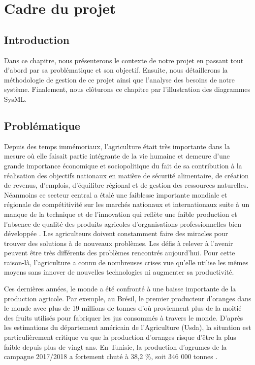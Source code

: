 

	\chapter{Cadre du projet }
\newpage


\section{Introduction }
Dans ce chapitre, nous présenterons le contexte de notre projet en passant tout d'abord par sa  problématique et son objectif. Ensuite, nous détaillerons la méthodologie de gestion de ce projet ainsi que l'analyse des besoins de notre système. Finalement, nous clôturons ce chapitre par l'illustration des diagrammes SysML.

\section{Problématique }
Depuis des temps immémoriaux, l'agriculture était très importante dans la mesure où elle faisait partie intégrante de la vie humaine et demeure d'une grande importance économique et sociopolitique du fait de sa contribution à la réalisation des objectifs nationaux en matière de sécurité alimentaire, de création de revenus, d'emplois, d'équilibre régional et de gestion des ressources naturelles. Néanmoins ce secteur central a étalé une faiblesse importante mondiale et régionale de compétitivité sur les marchés nationaux et internationaux suite à un manque de la technique et de l'innovation qui reflète une faible production et l'absence de qualité des produits agricoles d'organisations professionnelles bien développée . Les agriculteurs doivent constamment faire des miracles pour trouver des solutions à de nouveaux problèmes. Les défis à relever à l'avenir peuvent être très différents des problèmes rencontrés aujourd'hui. Pour cette raison-là, l'agriculture a connu de nombreuses crises vue qu'elle utilise les mêmes moyens sans innover de nouvelles technologies ni augmenter sa productivité.

Ces dernières années, le monde a été confronté à une baisse importante de la production agricole. Par exemple, au Brésil, le premier producteur d'oranges dans le monde avec plus de 19 millions de tonnes d'où proviennent plus de la moitié des fruits utilisés pour fabriquer les jus consommés à travers le monde. D'après les estimations du département américain de l'Agriculture (Usda), la situation est particulièrement critique vu que la production d'oranges risque d'être la plus faible depuis plus de vingt ans. En Tunisie, la production d'agrumes de la campagne 2017/2018 a fortement chuté à 38,2 \%, soit 346 000 tonnes \cite{onagri2017/2018}.

